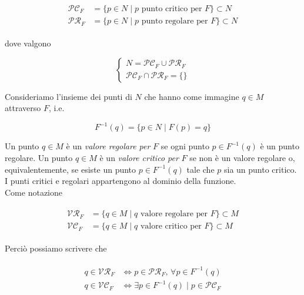 \begin{align}
	\begin{split}
		\mathcal{PC}_{F} &= \{ p \in N \mid p \text{ punto critico per } F \} \subset N\\
		\mathcal{PR}_{F} &= \{ p \in N \mid p \text{ punto regolare per } F \} \subset N
	\end{split}
\end{align}

dove valgono

\begin{equation}
	\begin{cases}
		N = \mathcal{PC}_{F} \cup \mathcal{PR}_{F}\\
		\mathcal{PC}_{F} \cap \mathcal{PR}_{F} = \{\}
	\end{cases}
\end{equation}

Consideriamo l'insieme dei punti di $ N $ che hanno come immagine $ q \in M $ attraverso $ F $, i.e.

\begin{equation}
	F^{-1}(q) = \{ p \in N \mid F(p) = q \}
\end{equation}

Un punto $ q \in M $ è un \textit{valore regolare per} $ F $ se ogni punto $ p \in F^{-1}(q) $ è un punto regolare. Un punto $ q \in M $ è un \textit{valore critico per} $ F $ se non è un valore regolare o, equivalentemente, se esiste un punto $ p \in F^{-1}(q) $ tale che $ p $ sia un punto critico.\\
I punti critici e regolari appartengono al dominio della funzione.\\
Come notazione

\begin{align}
	\begin{split}
		\mathcal{VR}_{F} &= \{ q \in M \mid q \text{ valore regolare per } F \} \subset M\\
		\mathcal{VC}_{F} &= \{ q \in M \mid q \text{ valore critico per } F \} \subset M
	\end{split}
\end{align}

Perciò possiamo scrivere che

\begin{align}
	\begin{split}
		q \in \mathcal{VR}_{F} &\iff p \in \mathcal{PR}_{F}, \, \forall p \in F^{-1}(q)\\
		q \in \mathcal{VC}_{F} &\iff \exists p \in F^{-1}(q) \mid p \in \mathcal{PC}_{F}
	\end{split}
\end{align}

